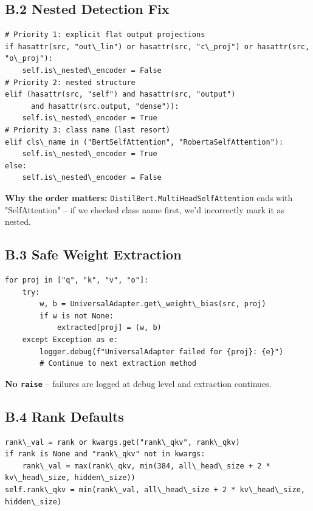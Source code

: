\subsection{B.2 Nested Detection Fix}

\begin{lstlisting}
# Priority 1: explicit flat output projections
if hasattr(src, "out\_lin") or hasattr(src, "c\_proj") or hasattr(src, "o\_proj"):
    self.is\_nested\_encoder = False
# Priority 2: nested structure
elif (hasattr(src, "self") and hasattr(src, "output") 
      and hasattr(src.output, "dense")):
    self.is\_nested\_encoder = True
# Priority 3: class name (last resort)
elif cls\_name in ("BertSelfAttention", "RobertaSelfAttention"):
    self.is\_nested\_encoder = True
else:
    self.is\_nested\_encoder = False
\end{lstlisting}

\textbf{Why the order matters:} \texttt{DistilBert.MultiHeadSelfAttention} ends with 
"SelfAttention" -- if we checked class name first, we'd incorrectly mark it 
as nested.

\subsection{B.3 Safe Weight Extraction}

\begin{lstlisting}
for proj in ["q", "k", "v", "o"]:
    try:
        w, b = UniversalAdapter.get\_weight\_bias(src, proj)
        if w is not None:
            extracted[proj] = (w, b)
    except Exception as e:
        logger.debug(f"UniversalAdapter failed for {proj}: {e}")
        # Continue to next extraction method
\end{lstlisting}

\textbf{No \texttt{raise}} -- failures are logged at debug level and extraction continues.

\subsection{B.4 Rank Defaults}

\begin{lstlisting}
rank\_val = rank or kwargs.get("rank\_qkv", rank\_qkv)
if rank is None and "rank\_qkv" not in kwargs:
    rank\_val = max(rank\_qkv, min(384, all\_head\_size + 2 * kv\_head\_size, hidden\_size))
self.rank\_qkv = min(rank\_val, all\_head\_size + 2 * kv\_head\_size, hidden\_size)
\end{lstlisting}

